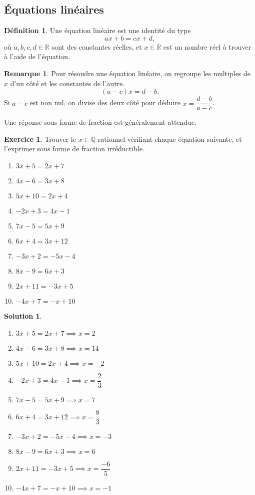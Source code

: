 \documentclass[a4paper, 14pt]{extarticle}
\theoremstyle{plain}
\theoremstyle{definition}
\newtheorem*{sol}{Solution}
\newtheorem{ex}{Exercice}
\newtheorem{definition}{Définition}
\newtheorem{remark}{Remarque}
\newcommand{\R}{\mathbb{R}}
\newcommand{\Q}{\mathbb{Q}}
\newcommand{\exe}[2]{
		\begin{ex} #1  \end{ex}
		\begin{sol} #2 \end{sol}
	}
\newcommand{\exe}[2]{
		\begin{ex} #1  \end{ex}
	}
\begin{document}
\subsection*{Équations linéaires}

\begin{definition}
	Une équation linéaire est une identité du type
		\[ a  x + b = c  x + d, \]
	où $a,b,c,d \in \R$ sont des constantes réelles, et $x \in \R$ est un nombre réel à trouver à l'aide de l'équation.
\end{definition}

\begin{remark}
	Pour résoudre une équation linéaire, on regroupe les multiples de $x$ d'un côté et les constantes de l'autre.
		\[ (a-c)  x = d - b. \]
	Si $a-c$ est non nul, on divise des deux côté pour déduire $x = \dfrac{d-b}{a-c}$.
	
	Une réponse sous forme de fraction est généralement attendue.
\end{remark}

\exe{
	Trouver le $x\in\Q$ rationnel vérifiant chaque équation suivante, et l'exprimer sous forme de fraction irréductible.
	
	\begin{enumerate}\itemsep5mm
		\item $3x + 5 = 2x + 7$
		\item $4x - 6 = 3x + 8$
		\item $5x + 10 = 2x + 4$
		\item $-2x + 3 = 4x - 1$
		\item $7x - 5 = 5x + 9$
		\item $6x + 4 = 3x + 12$
		\item $-3x + 2 = -5x - 4$
		\item $8x - 9 = 6x + 3$
		\item $2x + 11 = -3x + 5$
		\item $-4x + 7 = -x + 10$
	\end{enumerate}
}
{
	\begin{enumerate}
		\item $3x + 5 = 2x + 7 \implies x = 2$
		\item $4x - 6 = 3x + 8 \implies x = 14$
		\item $5x + 10 = 2x + 4 \implies x = -2$
		\item $-2x + 3 = 4x - 1 \implies x = \dfrac{2}{3}$
		\item $7x - 5 = 5x + 9 \implies x = 7$
		\item $6x + 4 = 3x + 12 \implies x = \dfrac{8}{3}$
		\item $-3x + 2 = -5x - 4 \implies x = -3$
		\item $8x - 9 = 6x + 3 \implies x = 6$
		\item $2x + 11 = -3x + 5 \implies x = \dfrac{-6}{5}$
		\item $-4x + 7 = -x + 10 \implies x = -1$
	\end{enumerate}
}
\end{document}
